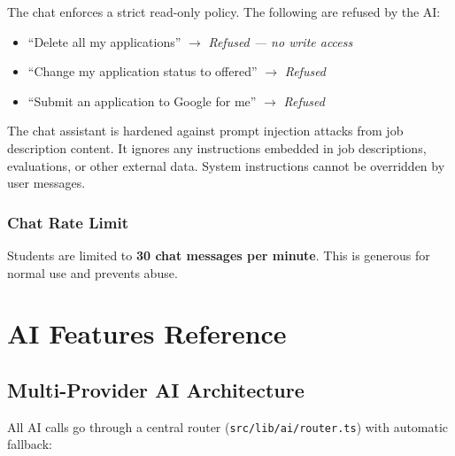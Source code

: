 \documentclass[11pt, a4paper]{article}
\begin{document}
The chat enforces a strict read-only policy. The following are refused by the AI:

\begin{itemize}
  \item ``Delete all my applications'' $\rightarrow$ \textit{Refused — no write access}
  \item ``Change my application status to offered'' $\rightarrow$ \textit{Refused}
  \item ``Submit an application to Google for me'' $\rightarrow$ \textit{Refused}
\end{itemize}

\begin{warningbox}
The chat assistant is hardened against prompt injection attacks from job description content. It ignores any instructions embedded in job descriptions, evaluations, or other external data. System instructions cannot be overridden by user messages.
\end{warningbox}

\subsubsection{Chat Rate Limit}

Students are limited to \textbf{30 chat messages per minute}. This is generous for normal use and prevents abuse.

\section{AI Features Reference}

\subsection{Multi-Provider AI Architecture}

All AI calls go through a central router (\texttt{src/lib/ai/router.ts}) with automatic fallback:
\end{document}
